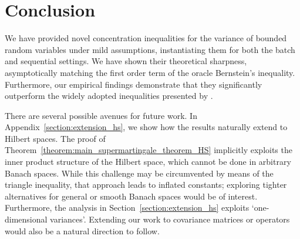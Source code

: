 \section{Conclusion} \label{section:conclusion}

We have provided novel concentration inequalities for the variance of bounded random variables under mild assumptions, instantiating them for both the batch and sequential settings. We have shown their theoretical sharpness, asymptotically matching the  first order term of the oracle Bernstein's inequality. Furthermore, our empirical findings demonstrate that they significantly outperform the widely adopted inequalities presented by \citet[Theorem 10]{maurer2009empirical}.


There are several possible avenues for future work. In  Appendix~\ref{section:extension_hs}, we show how the results naturally extend to Hilbert spaces. The proof of Theorem~\ref{theorem:main_supermartingale_theorem_HS} implicitly exploits the inner product structure of the Hilbert space, which cannot be done in arbitrary Banach spaces. While this challenge may be circumvented by means of the triangle inequality, that approach leads to inflated constants; exploring tighter alternatives for general or smooth Banach spaces would be of interest. Furthermore,  the analysis in Section~\ref{section:extension_hs} exploits `one-dimensional variances'. Extending our work to  covariance matrices or operators would also be a natural direction to follow. %

